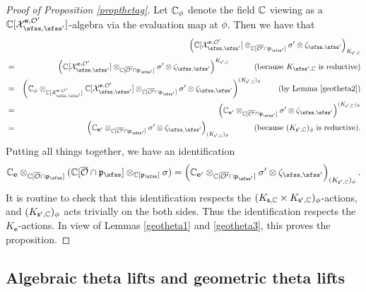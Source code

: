 \documentclass[12pt,a4paper]{amsart}
\newcommand{\CO}{{\mathcal {O}}}
\newcommand{\CX}{{\mathcal {X}}}
\newcommand{\p}{\mathfrak p}
\numberwithin{equation}{section}
\theoremstyle{remark}
\begin{document}
\begin{proof}[Proof of Proposition \ref{propthetag}]
 Let $\mathbb{C}_\phi$ denote the field $\mathbb{C}$ viewing as a $\C[\CX_{\sfss, \sfss'}^{\mathbf e, \CO'}]$-algebra via the evaluation map at $\phi$. Then we have that
\begin{eqnarray*}
      &&\left( \C[\CX_{\sfss, \sfss'}^{\mathbf e, \CO'}] \otimes_{\C[\overline{\CO'}\cap \p_{\sfss'}]}\sigma'\otimes \zeta_{\sfss, \sfss'}\right)_{K_{\mathsf s', \C}}\\
             &=&\left( \C[\CX_{\sfss, \sfss'}^{\mathbf e, \CO'}] \otimes_{\C[\overline{\CO'}\cap \p_{\sfss'}]}\sigma'\otimes \zeta_{\sfss, \sfss'}\right)^{K_{\mathsf s', \C}}\quad \qquad (\textrm{because $K_{\sfss',\C}$ is reductive})\\
             &=&\left( \C_\phi\otimes_{\C[\CX_{\sfss, \sfss'}^{\mathbf e, \CO'}]} \C[\CX_{\sfss, \sfss'}^{\mathbf e, \CO'}] \otimes_{\C[\overline{\CO'}\cap \p_{\sfss'}]}\sigma'\otimes \zeta_{\sfss, \sfss'}\right)^{ (K_{\mathsf s',\C})_\phi} \qquad (\textrm{by Lemma \ref{geotheta2}})\\
               &=&\left( \C_{\mathbf e'}  \otimes_{\C[\overline{\CO'}\cap \p_{\sfss'}]}\sigma'\otimes \zeta_{\sfss, \sfss'}\right)^{ (K_{\mathsf s',\C})_\phi}\\
                 &=&\left( \C_{\mathbf e'}  \otimes_{\C[\overline{\CO'}\cap \p_{\sfss'}]}\sigma'\otimes \zeta_{\sfss, \sfss'}\right)_{ (K_{\mathsf s',\C})_\phi} \quad \qquad (\textrm{because $ (K_{\mathsf s',\C})_\phi$ is reductive}).
\end{eqnarray*}
Putting all things together, we have an identification
\[
\C_\mathbf e \otimes_{\C[\overline \CO\cap \p_{\sfss}]} (\C[\overline \CO\cap \p_{\sfss}]\otimes_{\C[\p_{\sfss}]} \sigma)=\left( \C_{\mathbf e'}  \otimes_{\C[\overline{\CO'}\cap \p_{\sfss'}]}\sigma'\otimes \zeta_{\sfss, \sfss'}\right)_{ (K_{\mathsf s',\C})_\phi}.
\]
It is routine to check that this identification respects the $(K_{\mathsf s,\mathbb{C}}\times K_{\mathsf s', \mathbb{C}})_\phi$-actions, and $ (K_{\mathsf s',\mathbb{C}})_\phi$ acts trivially on the both sides. Thus the identification respects the $K_{\mathbf e}$-actions. In view of Lemmas \ref{geotheta1} and \ref{geotheta3}, this proves the proposition.
\end{proof}


\subsection{Algebraic theta lifts and  geometric theta lifts}
\end{document}
